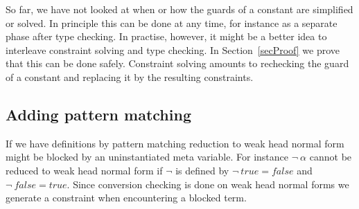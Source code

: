 So far, we have not looked at when or how the guards of a constant are
simplified or solved. In principle this can be done at any time, for instance
as a separate phase after type checking. In practise, however, it might be a
better idea to interleave constraint solving and type checking. In
Section~\ref{secProof} we prove that this can be done safely.
Constraint solving amounts to rechecking the guard of a constant and replacing
it by the resulting constraints.

% 


\if {}
\subsection{Adding pattern matching} \label{secAddPatternMatching}

If we have definitions by pattern matching reduction to weak head normal form
might be blocked by an uninstantiated meta variable. For instance $\neg ~
\alpha$ cannot be reduced to weak head normal form if $\neg$ is defined by
$\neg ~\mathit{true} = \mathit{false}$ and $\neg ~\mathit{false} =
\mathit{true}$. Since conversion checking is done on weak head normal forms we
generate a constraint when encountering a blocked term.

% 
% 

\fi
